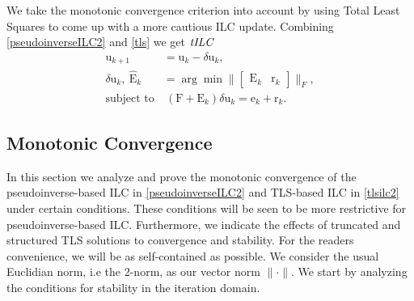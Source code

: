 \documentclass[10pt,a4paper]{article}
\theoremstyle{plain}
\theoremstyle{definition}
\newcommand{\boldvec}[1]{\boldsymbol{\mathrm{#1}}}
\let\vec\boldvec
\newcommand{\error}{\vec{e}} %
\newcommand{\sysInput}{\vec{u}} %
\newcommand{\residual}{\vec{r}} %
\newcommand{\errorMat}{\vec{E}} %
\newcommand{\systemMat}{\vec{F}} %
\newcommand{\alg}{\emph{tILC}}
\begin{document}
We take the monotonic convergence criterion into account by using Total Least Squares to come up with a more cautious ILC update. Combining \eqref{pseudoinverseILC2} and \eqref{tls} we get $\alg$
%
\begin{align}
\sysInput_{k+1} &= \sysInput_{k} - \delta \sysInput_{k}, \label{tlsilc1} \\ 
\delta \sysInput_{k}, \ \hat{\errorMat}_k &= \arg\min \|\begin{bmatrix}\errorMat_k & \residual_k \end{bmatrix} \|_{F}, \label{tlsilc2} \\
\text{subject to} &\ (\systemMat + \errorMat_k)\delta \sysInput_k = \error_k + \residual_k \label{tlsilc3}.
\end{align}
%

\subsection{Monotonic Convergence}\label{monotonic}

In this section we analyze and prove the monotonic convergence of the pseudoinverse-based ILC in \eqref{pseudoinverseILC2} and TLS-based ILC in \eqref{tlsilc2} under certain conditions. These conditions will be seen to be more restrictive for pseudoinverse-based ILC. Furthermore, we indicate the effects of truncated and structured TLS solutions to convergence and stability. For the readers convenience, we will be as self-contained as possible. We consider the usual Euclidian norm, i.e the 2-norm, as our vector norm $\|\cdot\|$. We start by analyzing the conditions for stability in the iteration domain. 
\end{document}
